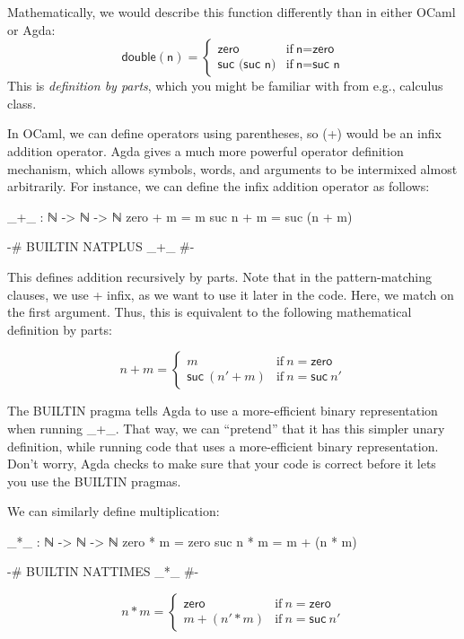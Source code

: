 \documentclass{lecturenotes}
\begin{document}
Mathematically, we would describe this function differently than in either OCaml or Agda:
$$
\textsf{double}(\textsf{n}) = \left\{\begin{array}{ll}
  \textsf{zero} & \text{if}~\textsf{n}=\textsf{zero}\\
  \textsf{suc (suc n)} & \text{if}~\textsf{n}=\textsf{suc n}
\end{array}\right.
$$
This is \emph{definition by parts}, which you might be familiar with from e.g., calculus class.

In OCaml, we can define operators using parentheses, so \textsf{(+)} would be an infix addition operator.
Agda gives a much more powerful operator definition mechanism, which allows symbols, words, and arguments to be intermixed almost arbitrarily.
For instance, we can define the infix addition operator as follows:
\begin{center}
\begin{code}
  _+_ : ℕ -> ℕ -> ℕ
  zero + m = m
  suc n + m = suc (n + m)

  {-# BUILTIN NATPLUS _+_ #-}
\end{code}
\end{center}

This defines addition recursively by parts.
Note that in the pattern-matching clauses, we use + infix, as we want to use it later in the code.
Here, we match on the first argument.
Thus, this is equivalent to the following mathematical definition by parts:

$$
n + m = \left\{\begin{array}{ll}
  m & \text{if}~ n = \textsf{zero}\\
  \textsf{suc}~(n' + m) & \text{if}~n=\textsf{suc}~n'
\end{array}
\right.
$$

The \textsf{BUILTIN} pragma tells Agda to use a more-efficient binary representation when running \textsf{\_+\_}.
That way, we can ``pretend'' that it has this simpler unary definition, while running code that uses a more-efficient binary representation.
Don't worry, Agda checks to make sure that your code is correct before it lets you use the \textsf{BUILTIN} pragmas.

We can similarly define multiplication:\\
\begin{minipage}{0.5\linewidth}
\begin{code}
  _*_ : ℕ -> ℕ -> ℕ
  zero * m = zero
  suc n * m = m + (n * m)

  {-# BUILTIN NATTIMES _*_ #-}
\end{code}
\end{minipage}
\begin{minipage}{0.5\linewidth}
  $$
  n * m = \left\{\begin{array}{ll}
    \textsf{zero} & \text{if}~n=\textsf{zero}\\
    m + (n' * m) & \text{if}~n=\textsf{suc}~n'
  \end{array}\right.
$$
\end{minipage}
\end{document}
